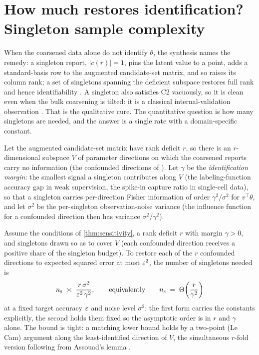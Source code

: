 \section{How much restores identification? Singleton sample complexity}
\label{sec:restoration}

When the coarsened data alone do not identify $\theta$, the synthesis names the
remedy: a singleton report, $|c(r)| = 1$, pins the latent value to a point, adds a
standard-basis row to the augmented candidate-set matrix, and so raises its column
rank; a set of singletons spanning the deficient subspace restores full rank and
hence identifiability \citep{towell2026synthesis}. A singleton also satisfies C2
vacuously, so it is clean even when the bulk coarsening is tilted: it is a classical
internal-validation observation \citep{tenenbein1970double,begg1983assessment}.
That is the qualitative cure. The quantitative question is how many singletons are
needed, and the answer is a single rate with a domain-specific constant.

Let the augmented candidate-set matrix have rank deficit $r$, so there is an
$r$-dimensional subspace $V$ of parameter directions on which the coarsened reports
carry no information (the confounded directions of \citet{towell2026synthesis}).
Let $\gamma$ be the \emph{identification margin}: the smallest signal a singleton
contributes along $V$ (the labeling-function accuracy gap in weak supervision, the
spike-in capture ratio in single-cell data), so that a singleton carries
per-direction Fisher information of order $\gamma^2/\sigma^2$ for $v^\top \theta$,
and let $\sigma^2$ be the per-singleton observation-noise variance (the influence
function for a confounded direction then has variance $\sigma^2/\gamma^2$).

\begin{theorem}
\label{thm:restoration}
Assume the conditions of \cref{thm:sensitivity}, a rank deficit $r$ with margin
$\gamma > 0$, and singletons drawn so as to cover $V$ (each confounded direction
receives a positive share of the singleton budget). To restore each of the $r$
confounded directions to expected squared error at most $\varepsilon^2$, the number of
singletons needed is
\begin{equation}
  n_{\mathrm{s}} \;\asymp\; \frac{r\, \sigma^2}{\varepsilon^2\, \gamma^2},
  \qquad\text{equivalently}\qquad
  n_{\mathrm{s}} \;=\; \Theta\!\left( \frac{r}{\gamma^2} \right)
  \label{eq:samplecomplexity}
\end{equation}
at a fixed target accuracy $\varepsilon$ and noise level $\sigma^2$; the first form carries
the constants explicitly, the second holds them fixed so the asymptotic order is in
$r$ and $\gamma$ alone. The bound is tight: a matching lower bound holds by a
two-point (Le Cam) argument along the least-identified direction of $V$, the
simultaneous $r$-fold version following from Assouad's lemma
\citep{tsybakov2009introduction}.
\end{theorem}

